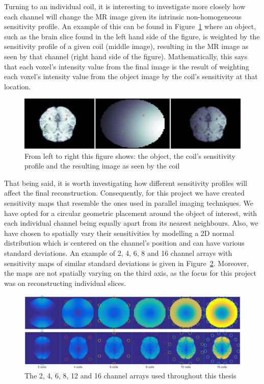 Turning to an individual coil, it is interesting to investigate more closely how each channel will change the MR image given its intrinsic non-homogeneous sensitivity profile. An example of this can be found in Figure~\ref{fig:1coil} where an object, such as the brain slice found in the left hand side of the figure, is weighted by the sensitivity profile of a given coil (middle image), resulting in the MR image as seen by that channel (right hand side of the figure). Mathematically, this says that each voxel's intensity value from the final image is the result of weighting each voxel's intensity value from the object image by the coil's sensitivity at that location.

\begin{figure}[H]
    \centering
    \includegraphics[width=1\textwidth,keepaspectratio]{1coil}
    \caption{From left to right this figure shows: the object, the coil's sensitivity profile and the resulting image as seen by the coil}
    \label{fig:1coil}
\end{figure}

That being said, it is worth investigating how different sensitivity profiles will affect the final reconstruction. Consequently, for this project we have created sensitivity maps that resemble the ones used in parallel imaging techniques. We have opted for a circular geometric placement around the object of interest, with each individual channel being equally apart from its nearest neighbours. Also, we have chosen to spatially vary their sensitivities by modelling a 2D normal distribution which is centered on the channel's position and can have various standard deviations. An example of 2, 4, 6, 8 and 16 channel arrays with sensitivity maps of similar standard deviations is given in Figure~\ref{fig:brainsAndCoilsDistrib}. Moreover, the maps are not spatially varying on the third axis, as the focus for this project was on reconstructing individual slices.

\begin{figure}[H]
    \centering
    \includegraphics[width=1\textwidth,keepaspectratio]{brainsAndCoilsDistribn2}
    \caption{The 2, 4, 6, 8, 12 and 16 channel arrays used throughout this thesis}
    \label{fig:brainsAndCoilsDistrib}
\end{figure}

